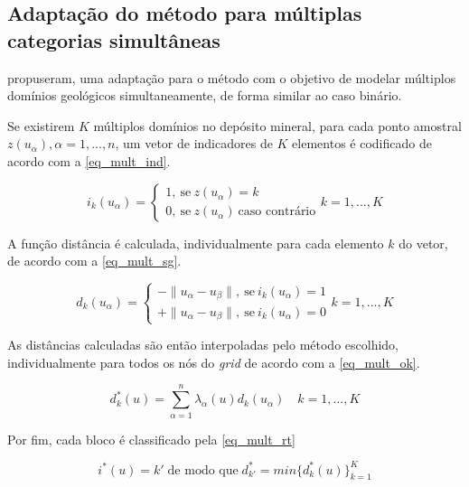 \subsection{Adaptação do método para múltiplas categorias simultâneas}\label{multi_cat}

 propuseram, uma adaptação para o método com o objetivo de modelar múltiplos domínios geológicos simultaneamente, de forma similar ao caso binário.

Se existirem $K$ múltiplos domínios no depósito mineral, para cada ponto amostral ${z(u_\alpha),\alpha=1,...,n}$, um vetor de indicadores de $K$ elementos é codificado de acordo com a \autoref{eq_mult_ind}.

\begin{equation}
	i_k(u_\alpha)=\begin{cases}
	1,\:\textrm{se}\:z(u_\alpha)=k\\
    0,\:\textrm{se}\:z(u_\alpha)\:\textrm{caso contrário}\end{cases} k=1,...,K
    \label{eq_mult_ind}
\end{equation}

A função distância é calculada, individualmente para cada elemento $k$ do vetor, de acordo com a \autoref{eq_mult_sg}.

\begin{equation}
	d_k(u_\alpha)=\begin{cases}
	-\parallel u_\alpha-u_\beta\parallel,\:\textrm{se}\:i_k(u_\alpha)=1\\
	+\parallel u_\alpha-u_\beta\parallel,\:\textrm{se}\:i_k(u_\alpha)=0\end{cases} k=1,...,K
    \label{eq_mult_sg}
\end{equation}

As distâncias calculadas são então interpoladas pelo método escolhido, individualmente para todos os nós do \textit{grid} de acordo com a \autoref{eq_mult_ok}.

\begin{equation}
	d_k^*(u)=\sum\limits_{\alpha=1}^n \lambda_\alpha(u)d_k(u_\alpha)\quad k=1,...,K
    \label{eq_mult_ok}
\end{equation}

Por fim, cada bloco é  classificado pela \autoref{eq_mult_rt}

\begin{equation}
	i^*(u)=k'\;\text{de modo que}\;d_{k'}^*=min\{d_k^*(u)\}_{k=1}^K
    \label{eq_mult_rt}
\end{equation}

